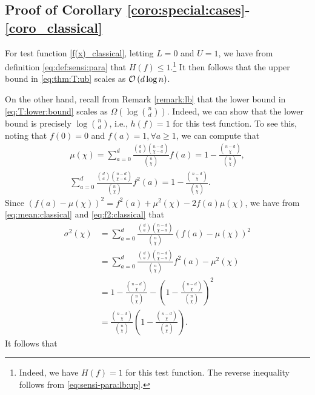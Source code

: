 \documentclass[onecolumn,letterpaper]{IEEEtran}
\newcommand{\cO}{{\cal O}}
\newcommand{\up}{{U}}
\newcommand{\lw}{{L}}
\newcommand{\na}{{a}}
\newcommand{\plsize}{{\chi}}
\newcommand{\mean}{{\mu}}
\newcommand{\var}{{\sigma^{2}}}
\newcommand{\fh}{{h(f)}}
\newcommand{\fH}{{H(f)}}
\begin{document}
\subsection{Proof of Corollary \ref{coro:special:cases}-\ref{coro_classical}} 
\label{app:coro_classical}
\begin{IEEEproof}
For test function \eqref{f(x)_classical}, letting $\lw=0$ and $\up=1$, we have from definition \eqref{eq:def:sensi:para} that $\fH\leq 1$.\footnote{\label{label:ft:H(f)=1}Indeed, we have $\fH=1$ for this test function. The reverse inequality follows from \eqref{eq:sensi-para:lb:up}.} It then follows that the upper bound in \eqref{eq:thm:T:ub} scales as $\cO \left(d\log n\right)$.




On the other hand, recall from Remark \ref{remark:lb} that the lower bound in \eqref{eq:T:lower:bound} scales as $\Omega\left(\log \binom{n}{d}\right)$. Indeed, we can show that the lower bound is precisely $\log \binom{n}{d}$, i.e., $\fh=1$ for this test function. To see this, noting that $f(0)=0$ and $f(a)=1, \forall a \geq 1$, we can compute that
\begin{align}
\label{eq:mean:classical}
    \mean(\plsize) = \sum\limits_{\na=0}^{d} \frac{\binom{d}{\na}\binom{n-d}{\plsize-\na}}{\binom{n}{\plsize}} f(\na) = 1 - \frac{\binom{n-d}{\plsize}}{\binom{n}{\plsize}},\\
     \sum\limits_{\na=0}^{d} \frac{\binom{d}{\na}\binom{n-d}{\plsize-\na}}{\binom{n}{\plsize}} f^2(\na) = 1 - \frac{\binom{n-d}{\plsize}}{\binom{n}{\plsize}}.\label{eq:f2:classical}
\end{align}
Since $(f(\na) - \mean(\plsize))^2=f^2(\na) +\mean^2(\plsize)-2f(\na)\mean(\plsize)$, we have from \eqref{eq:mean:classical} and \eqref{eq:f2:classical} that
\begin{align*}
    \var(\plsize) &= \sum\limits_{\na=0}^{d} \frac{\binom{d}{\na}\binom{n-d}{\plsize-\na}}{\binom{n}{\plsize}} (f(\na) - \mean(\plsize))^2\\
    &= \sum\limits_{\na=0}^{d} \frac{\binom{d}{\na}\binom{n-d}{\plsize-\na}}{\binom{n}{\plsize}} f^2(\na) - \mean^2(\plsize) \\ 
    &= 1 - \frac{\binom{n-d}{\plsize}}{\binom{n}{\plsize}} - \left( 1 - \frac{\binom{n-d}{\plsize}}{\binom{n}{\plsize}} \right)^2 \\ 
    &= \frac{\binom{n-d}{\plsize}}{\binom{n}{\plsize}} \left( 1 - \frac{\binom{n-d}{\plsize}}{\binom{n}{\plsize}} \right).
\end{align*}
It follows that 

\end{IEEEproof}
\end{document}
